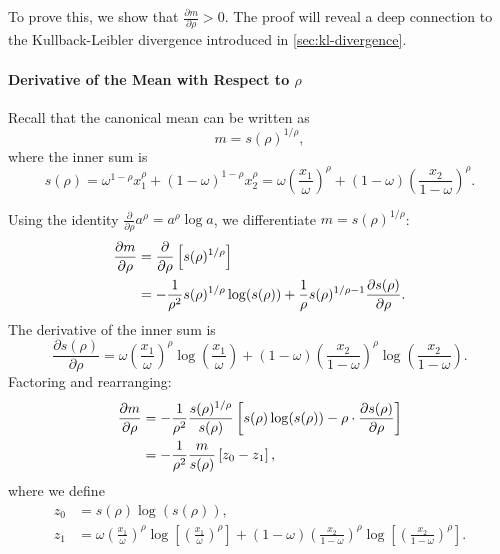 To prove this, we show that $\frac{\partial m}{\partial \rho} > 0$. The proof will reveal a deep connection to the Kullback-Leibler divergence introduced in \cref{sec:kl-divergence}.

\paragraph{Derivative of the Mean with Respect to $\rho$}

Recall that the canonical mean can be written as
\begin{equation}
m = s(\rho)^{1/\rho},
\end{equation}
where the inner sum is
\begin{equation}
s(\rho) = \omega^{1-\rho} x_1^\rho + (1-\omega)^{1-\rho} x_2^\rho = \omega \left( \frac{x_1}{\omega} \right)^\rho + (1-\omega) \left( \frac{x_2}{1-\omega} \right)^\rho.
\end{equation}

Using the identity $\frac{\partial}{\partial \rho} a^\rho = a^\rho \log a$, we differentiate $m = s(\rho)^{1/\rho}$:
\begin{align}
\frac{\partial m}{\partial \rho} &= \frac{\partial}{\partial \rho} \left[ s(\rho)^{1/\rho} \right] \notag \\
&= -\frac{1}{\rho^2} s(\rho)^{1/\rho} \log(s(\rho)) + \frac{1}{\rho} s(\rho)^{1/\rho - 1} \frac{\partial s(\rho)}{\partial \rho}.
\end{align}
The derivative of the inner sum is
\begin{equation}
\frac{\partial s(\rho)}{\partial \rho} = \omega \left( \frac{x_1}{\omega} \right)^\rho \log\left( \frac{x_1}{\omega} \right) + (1-\omega) \left( \frac{x_2}{1-\omega} \right)^\rho \log\left( \frac{x_2}{1-\omega} \right).
\end{equation}
Factoring and rearranging:
\begin{align}
\frac{\partial m}{\partial \rho} &= -\frac{1}{\rho^2} \frac{s(\rho)^{1/\rho}}{s(\rho)} \left[ s(\rho) \log(s(\rho)) - \rho \cdot \frac{\partial s(\rho)}{\partial \rho} \right] \notag \\
&= -\frac{1}{\rho^2} \frac{m}{s(\rho)} \left[ z_0 - z_1 \right],
\end{align}
where we define
\begin{align}
z_0 &= s(\rho) \log(s(\rho)), \\
z_1 &= \omega \left( \frac{x_1}{\omega} \right)^\rho \log\left[ \left( \frac{x_1}{\omega} \right)^\rho \right] + (1-\omega) \left( \frac{x_2}{1-\omega} \right)^\rho \log\left[ \left( \frac{x_2}{1-\omega} \right)^\rho \right].
\end{align}


